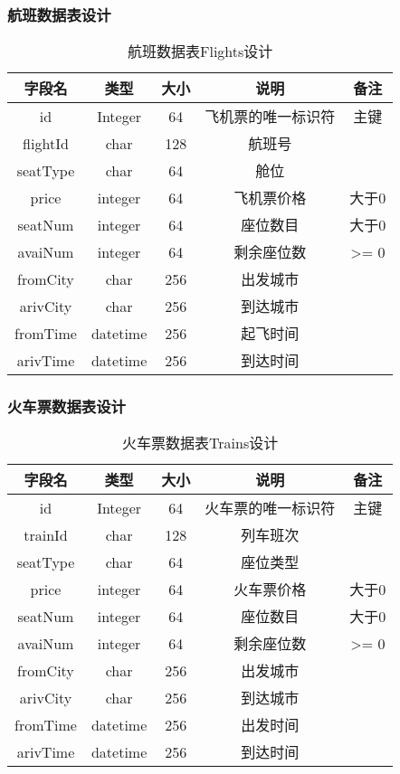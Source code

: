 \subsubsection{航班数据表设计}
\begin{table}[H]
\centering
\caption{航班数据表Flights设计} \label{tab:order-database}
\begin{tabular}{|c|c|c|c|c|}
    \hline
    字段名 & 类型 & 大小 & 说明 & 备注 \\
    \hline
    id & Integer & 64 & 飞机票的唯一标识符 & 主键\\
    \hline
    flightId & char & 128 & 航班号 &  \\
    \hline
    seatType & char & 64 & 舱位 & \\
    \hline
    price & integer & 64 & 飞机票价格 & 大于0 \\
    \hline
    seatNum & integer & 64 & 座位数目 & 大于0 \\
    \hline
    avaiNum & integer & 64 & 剩余座位数 & >= 0 \\
    \hline
    fromCity & char & 256 & 出发城市 & \\
    \hline
    arivCity & char & 256 & 到达城市 & \\
    \hline
    fromTime & datetime & 256 & 起飞时间 & \\
    \hline
    arivTime & datetime & 256 & 到达时间 & \\
    \hline
\end{tabular}
\end{table}


\subsubsection{火车票数据表设计}
\begin{table}[H]
\centering
\caption{火车票数据表Trains设计} \label{tab:order-database}
\begin{tabular}{|c|c|c|c|c|}
    \hline
    字段名 & 类型 & 大小 & 说明 & 备注 \\
    \hline
    id & Integer & 64 & 火车票的唯一标识符 & 主键\\
    \hline
    trainId & char & 128 & 列车班次 &  \\
    \hline
    seatType & char & 64 & 座位类型 & \\
    \hline
    price & integer & 64 & 火车票价格 & 大于0 \\
    \hline
    seatNum & integer & 64 & 座位数目 & 大于0 \\
    \hline
    avaiNum & integer & 64 & 剩余座位数 & >= 0 \\
    \hline
    fromCity & char & 256 & 出发城市 & \\
    \hline
    arivCity & char & 256 & 到达城市 & \\
    \hline
    fromTime & datetime & 256 & 出发时间 & \\
    \hline
    arivTime & datetime & 256 & 到达时间 & \\
    \hline
\end{tabular}
\end{table}


